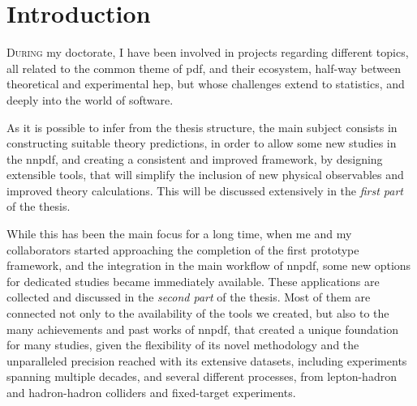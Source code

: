 
\cleardoublepage
{}

\chapter*{Introduction}
%
	{}

\lettrine[lines=3]{\color{BrickRed}D}{uring} my doctorate, I have been involved
in projects regarding different topics, all related to the common theme of
\acrfull{pdf}, and their ecosystem, half-way between theoretical and
experimental \acrfull{hep}, but whose challenges extend to statistics, and
deeply into the world of software.

As it is possible to infer from the thesis structure, the main subject
consists in constructing suitable theory predictions, in order to allow some
new studies in the \acrlong{nnpdf}, and creating a consistent and improved
framework, by designing extensible tools, that will simplify the inclusion of
new physical observables and improved theory calculations.
This will be discussed extensively in the \textit{first part} of the thesis.

While this has been the main focus for a long time, when me and my
collaborators started approaching the completion of the first prototype
framework, and the integration in the main workflow of \acrshort{nnpdf}, some
new options for dedicated studies became immediately available.
These applications are collected and discussed in the \textit{second part} of
the thesis.
Most of them are connected not only to the availability of the tools we
created, but also to the many achievements and past works of \acrshort{nnpdf},
that created a unique foundation for many studies, given the flexibility of its
novel methodology and the unparalleled precision reached with its extensive
datasets, including experiments spanning multiple decades, and several
different processes, from lepton-hadron and hadron-hadron colliders and
fixed-target experiments.
